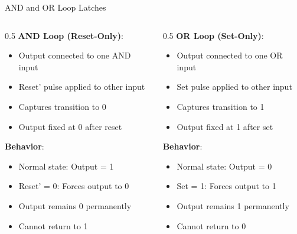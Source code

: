 \documentclass[aspectratio=169,11pt]{beamer}
\newcommand{\concept}[1]{\textbf{\color{accentcolor}#1}}
\begin{document}
\begin{frame}{AND and OR Loop Latches}
\begin{columns}
\begin{column}{0.5\textwidth}
\concept{AND Loop (Reset-Only)}:
\begin{itemize}
\item Output connected to one AND input
\item Reset' pulse applied to other input
\item Captures transition to 0
\item Output fixed at 0 after reset
\end{itemize}

\vspace{0.5cm}
\concept{Behavior}:
\begin{itemize}
\item Normal state: Output = 1
\item Reset' = 0: Forces output to 0
\item Output remains 0 permanently
\item Cannot return to 1
\end{itemize}
\end{column}
\begin{column}{0.5\textwidth}
\concept{OR Loop (Set-Only)}:
\begin{itemize}
\item Output connected to one OR input
\item Set pulse applied to other input
\item Captures transition to 1
\item Output fixed at 1 after set
\end{itemize}

\vspace{0.5cm}
\concept{Behavior}:
\begin{itemize}
\item Normal state: Output = 0
\item Set = 1: Forces output to 1
\item Output remains 1 permanently
\item Cannot return to 0
\end{itemize}
\end{column}
\end{columns}
\end{frame}
\end{document}
